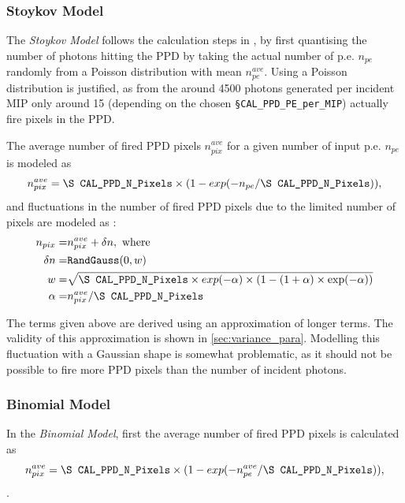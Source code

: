 \documentclass[12pt]{article} %
\begin{document}
\subsubsection*{Stoykov Model}
The \emph{Stoykov Model} follows the calculation steps in \cite{PPD}, by first quantising the number of photons hitting the PPD by taking the actual number of p.e. $n_{pe}$ randomly from a Poisson distribution with mean $n_{pe}^{ave}$. Using a Poisson distribution is justified, as from the around 4500 photons generated per incident MIP \cite{JGU_LA} only around 15 (depending on the chosen {\tt \S CAL\_PPD\_PE\_per\_MIP}) actually fire pixels in the PPD.

The average number of fired PPD pixels ${n}_{pix}^{ave}$ for a given number of input p.e. $n_{pe}$ is modeled as
\begin{equation*}
{n}_{pix}^{ave} = \text{\tt \S CAL\_PPD\_N\_Pixels} \times ( 1 - exp ( -n_{pe} / \text{\tt \S CAL\_PPD\_N\_Pixels}  ) ), 
\end{equation*}
and fluctuations in the number of fired PPD pixels due to the limited number of pixels are modeled as \cite{PPD}:
\begin{equation*}
\begin{split}
n_{pix} = & {n}_{pix}^{ave} + \delta n, \text{ where} \\
\delta n = & \text{\tt RandGauss}( 0, w ) \\
       w = & \sqrt{\text{\tt \S CAL\_PPD\_N\_Pixels} \times exp(-\alpha) \times ( 1 - (1+\alpha) \times \exp ( - \alpha ) ) } \\
       \alpha = & n_{pix}^{ave} / \text{\tt \S CAL\_PPD\_N\_Pixels}
\end{split}
\end{equation*}

The terms given above are derived using an approximation of longer terms. The validity of this approximation is shown in \ref{sec:variance_para}.
Modelling this fluctuation with a Gaussian shape is somewhat problematic, as it should not be possible to fire more PPD pixels than the number of incident photons.

\subsubsection*{Binomial Model}
In the \emph{Binomial Model}, first the average number of fired PPD pixels is calculated as 
\begin{equation*}
{n}_{pix}^{ave} = \text{\tt \S CAL\_PPD\_N\_Pixels} \times ( 1 - exp ( -n_{pe}^{ave} / \text{\tt \S CAL\_PPD\_N\_Pixels}  ) ), 
\end{equation*}.
\end{document}
